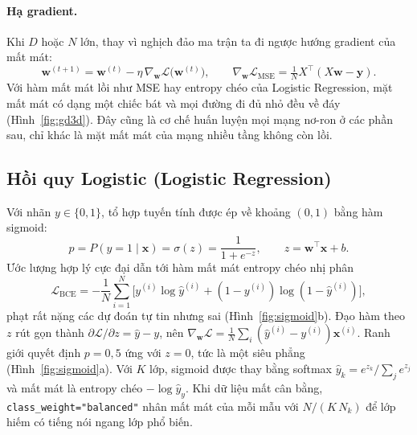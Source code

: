 
\paragraph{Hạ gradient.} Khi $D$ hoặc $N$ lớn, thay vì nghịch đảo ma trận ta đi ngược hướng gradient của mất mát:
\begin{equation}
  \mathbf{w}^{(t+1)} = \mathbf{w}^{(t)} - \eta\,\nabla_{\mathbf{w}}\mathcal{L}\big(\mathbf{w}^{(t)}\big),
  \qquad \nabla_{\mathbf{w}}\mathcal{L}_{\mathrm{MSE}} = \tfrac{1}{N}X^\top(X\mathbf{w} - \mathbf{y}).
\end{equation}
Với hàm mất mát lồi như MSE hay entropy chéo của Logistic Regression, mặt mất mát có dạng một chiếc bát và mọi đường đi
đủ nhỏ đều về đáy (Hình~\ref{fig:gd3d}). Đây cũng là cơ chế huấn luyện mọi mạng nơ-ron ở các phần sau, chỉ khác là mặt
mất mát của mạng nhiều tầng không còn lồi.


\subsection{Hồi quy Logistic (Logistic Regression)}

Với nhãn $y \in \{0, 1\}$, tổ hợp tuyến tính được ép về khoảng $(0, 1)$ bằng hàm sigmoid:
\begin{equation}
  p = P(y = 1 \mid \mathbf{x}) = \sigma(z) = \frac{1}{1 + e^{-z}}, \qquad z = \mathbf{w}^\top\mathbf{x} + b .
\end{equation}
Ước lượng hợp lý cực đại dẫn tới hàm mất mát entropy chéo nhị phân
\begin{equation}
  \mathcal{L}_{\mathrm{BCE}} = -\frac{1}{N}\sum_{i=1}^{N}\Big[y^{(i)}\log\hat y^{(i)} + (1 - y^{(i)})\log(1 - \hat y^{(i)})\Big],
  \label{eq:bce}
\end{equation}
phạt rất nặng các dự đoán tự tin nhưng sai (Hình~\ref{fig:sigmoid}b). Đạo hàm theo $z$ rút gọn thành
$\partial\mathcal{L}/\partial z = \hat y - y$, nên $\nabla_{\mathbf{w}}\mathcal{L} = \tfrac{1}{N}\sum_i (\hat y^{(i)} - y^{(i)})\mathbf{x}^{(i)}$.
Ranh giới quyết định $p = 0{,}5$ ứng với $z = 0$, tức là một siêu phẳng (Hình~\ref{fig:sigmoid}a). Với $K$ lớp, sigmoid
được thay bằng softmax $\hat y_k = e^{z_k}/\sum_j e^{z_j}$ và mất mát là entropy chéo $-\log \hat y_{y}$. Khi dữ liệu mất
cân bằng, \texttt{class\_weight="balanced"} nhân mất mát của mỗi mẫu với $N/(K\,N_k)$ để lớp hiếm có tiếng nói ngang lớp
phổ biến.

